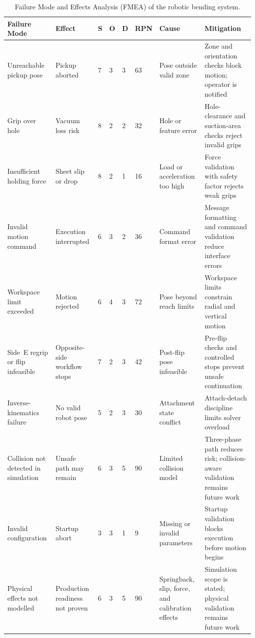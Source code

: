 \begin{landscape}
\begin{table}[p]
\centering
\normalsize
\setlength{\tabcolsep}{3pt}
\renewcommand{\arraystretch}{1.05}
\begin{tabularx}{\linewidth}{
L{3.4cm}
L{2.7cm}
C{0.7cm}
C{0.7cm}
C{0.7cm}
C{1.0cm}
L{3.2cm}
X
}
\hline
\textbf{Failure Mode} &
\textbf{Effect} &
\textbf{S} &
\textbf{O} &
\textbf{D} &
\textbf{RPN} &
\textbf{Cause} &
\textbf{Mitigation} \\
\hline
Unreachable pickup pose &
Pickup aborted &
7 & 3 & 3 & 63 &
Pose outside valid zone &
Zone and orientation checks block motion; operator is notified \\
\hline

Grip over hole &
Vacuum loss risk &
8 & 2 & 2 & 32 &
Hole or feature error &
Hole-clearance and suction-area checks reject invalid grips \\
\hline

Insufficient holding force &
Sheet slip or drop &
8 & 2 & 1 & 16 &
Load or acceleration too high &
Force validation with safety factor rejects weak grips \\
\hline

Invalid motion command &
Execution interrupted &
6 & 3 & 2 & 36 &
Command format error &
Message formatting and command validation reduce interface errors \\
\hline

Workspace limit exceeded &
Motion rejected &
6 & 4 & 3 & 72 &
Pose beyond reach limits &
Workspace limits constrain radial and vertical motion \\
\hline

Side~E regrip or flip infeasible &
Opposite-side workflow stops &
7 & 2 & 3 & 42 &
Post-flip pose infeasible &
Pre-flip checks and controlled stops prevent unsafe continuation \\
\hline

Inverse-kinematics failure &
No valid robot pose &
5 & 2 & 3 & 30 &
Attachment state conflict &
Attach-detach discipline limits solver overload \\
\hline

Collision not detected in simulation &
Unsafe path may remain &
6 & 3 & 5 & 90 &
Limited collision model &
Three-phase path reduces risk; collision-aware validation remains future work \\
\hline

Invalid configuration &
Startup abort &
3 & 3 & 1 & 9 &
Missing or invalid parameters &
Startup validation blocks execution before motion begins \\
\hline

Physical effects not modelled &
Production readiness not proven &
6 & 3 & 5 & 90 &
Springback, slip, force, and calibration effects &
Simulation scope is stated; physical validation remains future work \\
\hline
\end{tabularx}
\caption{Failure Mode and Effects Analysis (FMEA) of the robotic bending system.}
\label{tab:fmea}
\end{table}
\end{landscape}
